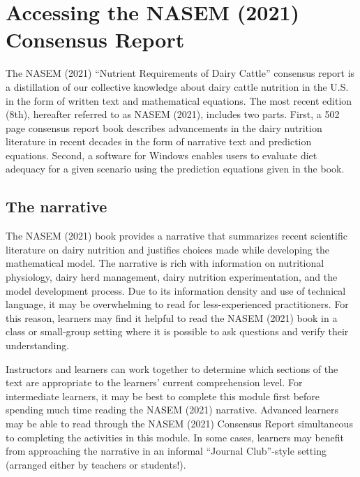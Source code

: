 \documentclass[
]{book}
\begin{document}
\hypertarget{accessing-the-nasem-2021-consensus-report}{%
\section{Accessing the NASEM (2021) Consensus Report}\label{accessing-the-nasem-2021-consensus-report}}

The NASEM (2021) ``Nutrient Requirements of Dairy Cattle'' consensus report is a distillation of our collective knowledge about dairy cattle nutrition in the U.S. in the form of written text and mathematical equations. The most recent edition (8th), hereafter referred to as NASEM (2021), includes two parts. First, a 502 page consensus report book describes advancements in the dairy nutrition literature in recent decades in the form of narrative text and prediction equations. Second, a software for Windows enables users to evaluate diet adequacy for a given scenario using the prediction equations given in the book.

\hypertarget{the-narrative}{%
\subsection{The narrative}\label{the-narrative}}

The NASEM (2021) book provides a narrative that summarizes recent scientific literature on dairy nutrition and justifies choices made while developing the mathematical model. The narrative is rich with information on nutritional physiology, dairy herd management, dairy nutrition experimentation, and the model development process. Due to its information density and use of technical language, it may be overwhelming to read for less-experienced practitioners. For this reason, learners may find it helpful to read the NASEM (2021) book in a class or small-group setting where it is possible to ask questions and verify their understanding.

Instructors and learners can work together to determine which sections of the text are appropriate to the learners' current comprehension level. For intermediate learners, it may be best to complete this module first before spending much time reading the NASEM (2021) narrative. Advanced learners may be able to read through the NASEM (2021) Consensus Report simultaneous to completing the activities in this module. In some cases, learners may benefit from approaching the narrative in an informal ``Journal Club''-style setting (arranged either by teachers or students!).
\end{document}
